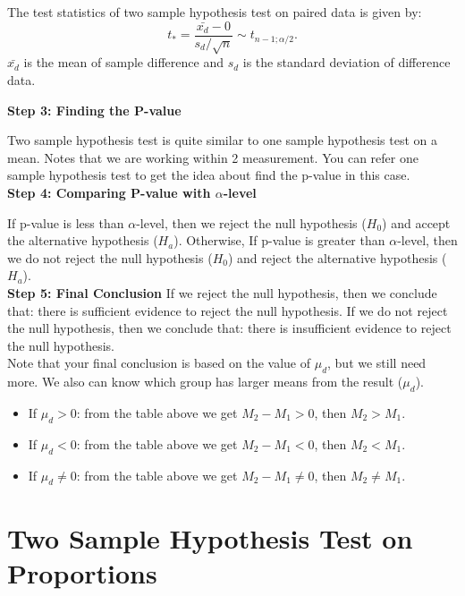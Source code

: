 \begin{definition}
The test statistics of two sample hypothesis test on paired data is given by: \[ t_* = \frac{\bar{x_d}-0}{s_d / \sqrt{n}} \sim t_{n-1;\alpha/2}.\]
$\bar{x_d}$ is the mean of sample difference and $s_d$ is the standard deviation of difference data.
\end{definition}

\textbf{Step 3: Finding the P-value}

Two sample hypothesis test is quite similar to one sample hypothesis test on a mean. Notes that we are working within 2 measurement. You can refer one sample hypothesis test to get the idea about find the p-value in this case.\\

\textbf{Step 4: Comparing P-value with $\alpha$-level}

If p-value is less than $\alpha$-level, then we reject the null hypothesis ($H_0$) and accept the alternative hypothesis ($H_a$). Otherwise, If p-value is greater than $\alpha$-level, then we do not reject the null hypothesis ($H_0$) and reject the alternative hypothesis ($H_a$).\\

\textbf{Step 5: Final Conclusion}
If we reject the null hypothesis, then we conclude that: there is sufficient evidence to reject the null hypothesis. If we do not reject the null hypothesis, then we conclude that: there is insufficient evidence to reject the null hypothesis.\\

Note that your final conclusion is based on the value of $\mu_d$, but we still need more. We also can know which group has larger means from the result ($\mu_d$).

\begin{itemize}
	\item If $\mu_d > 0$: from the table above we get $M_2-M_1 >0$, then $M_2 > M_1$.
	\item If $\mu_d < 0$: from the table above we get $M_2-M_1 <0$, then $M_2 < M_1$.
	\item If $\mu_d \neq 0$: from the table above we get $M_2-M_1 \neq 0$, then $M_2 \neq M_1$.
\end{itemize}

\section{Two Sample Hypothesis Test on Proportions}

